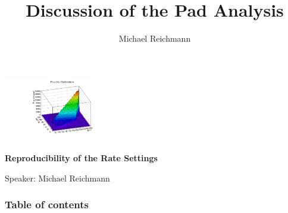 \documentclass[9pt]{beamer}
\title[Analysis]{Discussion of the Pad Analysis}
\author[M. Reichmann]{Michael Reichmann}
\institute[\textbf{\textit{ETH}}\scalebox{.6}{\textit{Z\"{u}rich}}]{Swiss Federal Institute of Technology Zurich}
\begin{document}
\begin{frame}
	\begin{center}
		\includegraphics[angle=270, width=4cm]{FluxVsCollimators}
	\end{center}
	\begin{alertblock}{
		\begin{center}
			\textbf{Reproducibility of the Rate Settings}
		\end{center}}
		\vspace*{10pt}
		\begin{center}\small
		Speaker: Michael Reichmann
		\end{center}\normalsize
	\end{alertblock}
\end{frame}
\usebackgroundtemplate{}
\begin{frame}[allowframebreaks]
	\frametitle{Table of contents}
	\tableofcontents   %
\end{frame}
\end{document}
